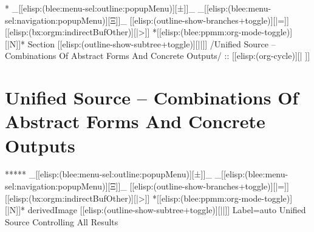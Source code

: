 \begin{whenOrg}
\begin{verblatex}
\begin{frame}[fragile,plain,label=figmmDocProduction]
\begin{articleMode}
\end{articleMode}




\end{frame}
\end{verblatex}


\begin{whenOrg}
*  _[[elisp:(blee:menu-sel:outline:popupMenu)][±]]_ _[[elisp:(blee:menu-sel:navigation:popupMenu)][Ξ]]_ [[elisp:(outline-show-branches+toggle)][|=]] [[elisp:(bx:orgm:indirectBufOther)][|>]] *[[elisp:(blee:ppmm:org-mode-toggle)][|N]]*  Section    [[elisp:(outline-show-subtree+toggle)][||]]   /Unified Source -- Combinations Of Abstract Forms And Concrete Outputs/ ::  [[elisp:(org-cycle)][| ]]
\end{whenOrg}

\section{Unified Source -- Combinations Of Abstract Forms And Concrete Outputs}

\begin{whenOrg}
*****  _[[elisp:(blee:menu-sel:outline:popupMenu)][±]]_ _[[elisp:(blee:menu-sel:navigation:popupMenu)][Ξ]]_ [[elisp:(outline-show-branches+toggle)][|=]] [[elisp:(bx:orgm:indirectBufOther)][|>]] *[[elisp:(blee:ppmm:org-mode-toggle)][|N]]*  derivedImage [[elisp:(outline-show-subtree+toggle)][||]] Label=auto Unified Source Controlling All Results
\end{whenOrg}


\end{whenOrg}
